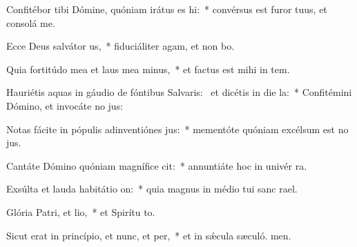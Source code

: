 \item Confitébor tibi Dómine, quóniam irátus es hi:~* convérsus est furor tuus, et consolá  me.
\item Ecce Deus salvátor us,~* fiduciáliter agam, et non bo.
\item Quia fortitúdo mea et laus mea minus,~* et factus est mihi in tem.
\item Hauriétis aquas in gáudio de fóntibus Salvaris:~\pscross{} et dicétis in die la:~* Confitémini Dómino, et invocáte no jus:
\item Notas fácite in pópulis adinventiónes jus:~* mementóte quóniam excélsum est no jus.
\item Cantáte Dómino quóniam magnífice cit:~* annuntiáte hoc in univér ra.
\item Exsúlta et lauda habitátio on:~* quia magnus in médio tui sanc rael.
\item Glória Patri, et lio,~* et Spirítu to.
\item Sicut erat in princípio, et nunc, et per,~* et in sǽcula sæculó. men.

